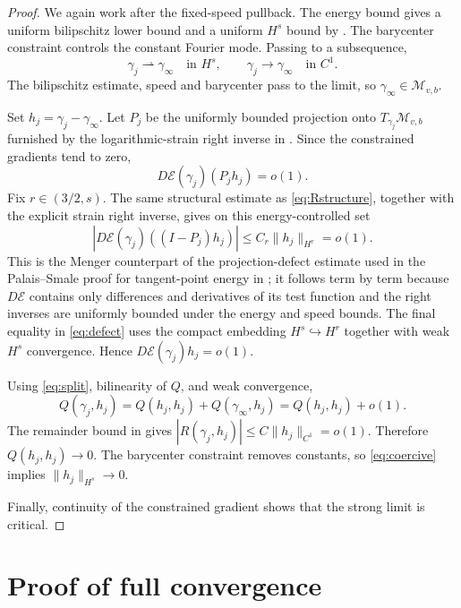 \documentclass[11pt]{article}
\theoremstyle{remark}
\newcommand{\E}{\mathcal E}
\newcommand{\M}{\mathcal M}
\begin{document}
\begin{proof}
We again work after the fixed-speed pullback.  The energy bound gives a
uniform bilipschitz lower bound and a uniform $H^s$ bound by
\cite[Theorem 1 and Proposition 2.1]{BR}.  The barycenter constraint controls
the constant Fourier mode.  Passing to a subsequence,
\[
 \gamma_j\rightharpoonup\gamma_\infty\quad\text{in }H^s,
 \qquad \gamma_j\to\gamma_\infty\quad\text{in }C^1.
\]
The bilipschitz estimate, speed and barycenter pass to the limit, so
$\gamma_\infty\in\M_{v,b}$.

Set $h_j=\gamma_j-\gamma_\infty$.  Let $P_j$ be the uniformly bounded
projection onto $T_{\gamma_j}\M_{v,b}$ furnished by the logarithmic-strain
right inverse in \cite[Section 5]{KSSM}.  Since the constrained gradients tend
to zero,
\[
 D\E(\gamma_j)(P_jh_j)=o(1).
\]
Fix $r\in(3/2,s)$.  The same structural estimate as
\eqref{eq:Rstructure}, together with the explicit strain right inverse, gives
on this energy-controlled set
\begin{equation}\label{eq:defect}
 |D\E(\gamma_j)((I-P_j)h_j)|
 \le C_r\|h_j\|_{H^r}=o(1).
\end{equation}
This is the Menger counterpart of the projection-defect estimate used in the
Palais--Smale proof for tangent-point energy in \cite[Section 4]{FSZM}; it
follows term by term because $D\E$ contains only differences and derivatives
of its test function and the right inverses are uniformly bounded under the
energy and speed bounds.  The final equality in \eqref{eq:defect} uses the
compact embedding $H^s\hookrightarrow H^r$ together with weak $H^s$
convergence.  Hence $D\E(\gamma_j)h_j=o(1)$.

Using \eqref{eq:split}, bilinearity of $Q$, and weak convergence,
\[
 Q(\gamma_j,h_j)=Q(h_j,h_j)+Q(\gamma_\infty,h_j)
                 =Q(h_j,h_j)+o(1).
\]
The remainder bound in \cite[Lemma 4.2 and Proposition 4.3]{BR} gives
$|R(\gamma_j,h_j)|\le C\|h_j\|_{C^1}=o(1)$.  Therefore
$Q(h_j,h_j)\to0$.  The barycenter constraint removes constants, so
\eqref{eq:coercive} implies $\|h_j\|_{H^s}\to0$.

Finally, continuity of the constrained gradient shows that the strong limit
is critical.
\end{proof}

\section{Proof of full convergence}
\end{document}
